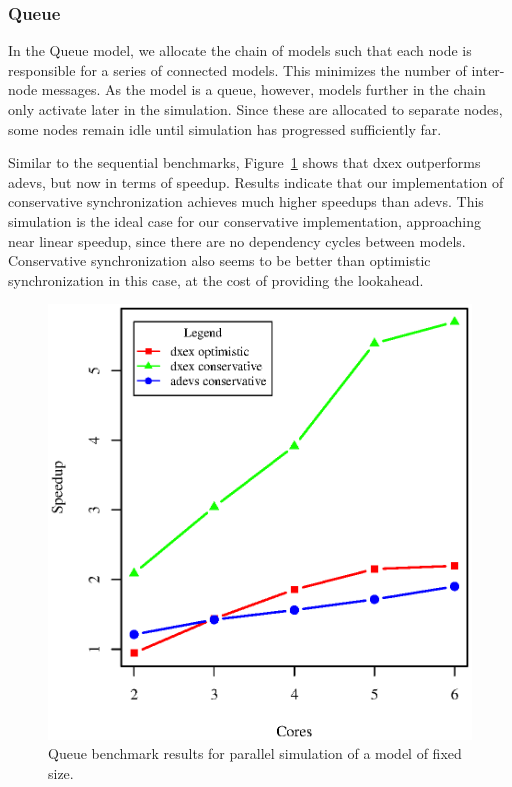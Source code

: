 \subsubsection{Queue}
In the Queue model, we allocate the chain of models such that each node is responsible for a series of connected models.
This minimizes the number of inter-node messages.
As the model is a queue, however, models further in the chain only activate later in the simulation.
Since these are allocated to separate nodes, some nodes remain idle until simulation has progressed sufficiently far.

Similar to the sequential benchmarks, Figure~\ref{fig:queue_benchmark_parallel} shows that dxex outperforms adevs, but now in terms of speedup.
Results indicate that our implementation of conservative synchronization achieves much higher speedups than adevs.
This simulation is the ideal case for our conservative implementation, approaching near linear speedup, since there are no dependency cycles between models.
Conservative synchronization also seems to be better than optimistic synchronization in this case, at the cost of providing the lookahead.

\begin{figure}
    \center
	\includegraphics[width=\plotfraction\columnwidth]{fig/queue_parallel.eps}
	\caption{Queue benchmark results for parallel simulation of a model of fixed size.}
	\label{fig:queue_benchmark_parallel}
\end{figure}

